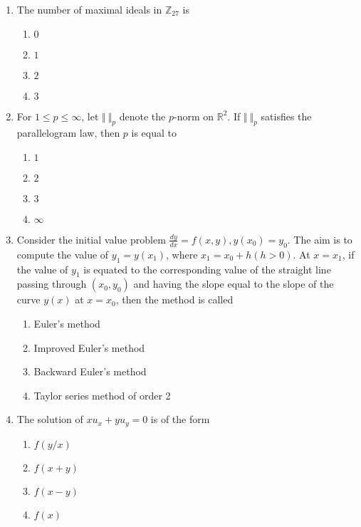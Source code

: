 \documentclass[journal]{IEEEtran}
\begin{document}
\begin{enumerate}
\item {The number of maximal ideals in $\mathbb{Z}_{27}$ is  
\begin{multicols}{4}
    \begin{enumerate}
        \item $0$
        \item $1$
        \item $2$
        \item $3$
    \end{enumerate}
\end{multicols}
}

\item {For $1\leq p \leq\infty$, let $\Vert\:\Vert_p$ denote the $p$-norm on $\mathbb{R}^2$. If $\Vert\:\Vert_p$ satisfies the parallelogram law, then $p$ is equal to
\begin{multicols}{4}
    \begin{enumerate}
        \item $1$
        \item $2$
        \item $3$
        \item $\infty$
    \end{enumerate}
\end{multicols}
}

\item { Consider the initial value problem $\frac{dy}{dx} = f(x, y), y(x_0) = y_0$. The aim is to compute the value of $y_1 = y(x_1)$, where $x_1 = x_0 + h (h>0)$. At $x=x_1$, if the value of $y_1$ is equated to the corresponding value of the straight line passing through $(x_0, y_0)$ and having the slope equal to the slope of the curve $y(x)$ at $x = x_0$, then the method is called 

\begin{multicols}{2}
\begin{enumerate}
    \item Euler's method
    \item Improved Euler's method
    \item Backward Euler's method
    \item Taylor series method of order 2
\end{enumerate}
\end{multicols}
}

\item{The solution of $xu_x + yu_y =0$ is of the form
\begin{multicols}{4}
    \begin{enumerate}
        \item $f(y/x)$
        \item $f(x+y) $
        \item $f(x-y)$
        \item $f(x)$
    \end{enumerate}
\end{multicols}}


\end{enumerate}
\end{document}

